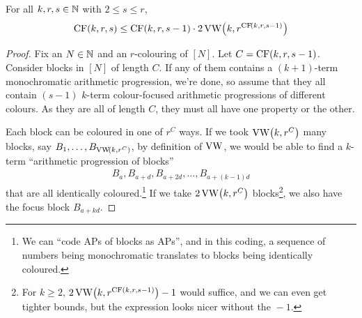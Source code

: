 \begin{boxlemma}\label{Ch6:Lemma:CF_Recursion}
    For all $k, r, s \in \mathbb{N}$ with $2 \leq s \leq r$,
    \begin{align*}
        \operatorname{CF}(k, r, s)
        \leq \operatorname{CF}(k, r, s - 1) \cdot 2 \operatorname{VW}\!\left( k, r^{\operatorname{CF}\!\left( k, r, s - 1 \right)} \right)
    \end{align*}
\end{boxlemma}
\begin{proof}
    Fix an $N \in \mathbb{N}$ and an $r$-colouring of $[N]$. Let $C = \operatorname{CF}\!\left( k, r, s - 1 \right)$. Consider blocks in $[N]$ of length $C$. If any of them contains a $(k + 1)$-term monochromatic arithmetic progression, we're done, so assume that they all contain $(s - 1)$ $k$-term colour-focused arithmetic progressions of different colours. As they are all of length $C$, they must all have one property or the other.
    
    Each block can be coloured in one of $r^C$ ways. If we took $\operatorname{VW}\!\left( k, r^C \right)$ many blocks, say $B_1, \ldots, B_{\operatorname{VW}\!\left( k, r^C \right)}$, by definition of $\operatorname{VW}$, we would be able to find a $k$-term ``arithmetic progression of blocks''
    \begin{align*}
        B_{a}, B_{a + d}, B_{a + 2d}, \ldots, B_{a + (k - 1)d}
    \end{align*}
    that are all identically coloured.\footnote{We can ``code APs of blocks as APs'', and in this coding, a sequence of numbers being monochromatic translates to blocks being identically coloured.} If we take $2\operatorname{VW}\!\left( k, r^C \right)$ blocks\footnote{For $k \geq 2$, $2\operatorname{VW}\!\left( k, r^{\operatorname{CF}(k, r, s - 1)} \right) - 1$ would suffice, and we can even get tighter bounds, but the expression looks nicer without the ${} - 1$.}, we also have the focus block $B_{a + kd}$.


\end{proof}
